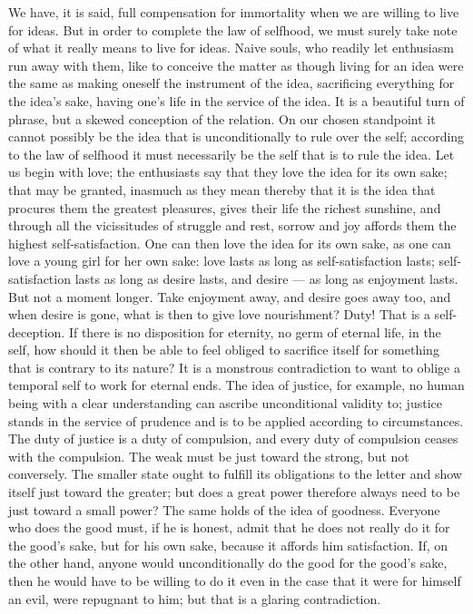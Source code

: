 \documentclass[12pt,a4paper,openany]{book}
\newcommand{\opage}[1]{\marginnote{\footnotesize\textit{[#1]}}}
\begin{document}
We have, it is said, full compensation for immortality
when we are willing to live for ideas. But in order to complete the law of selfhood,
we must surely take note of what it really means
to live for ideas. Naive souls, who readily let enthusiasm
run away with them, like to conceive the matter as though
living for an idea were the same as making oneself
the instrument of the idea, sacrificing everything for the idea's sake, having one's
life in the service of the idea. It is a beautiful turn of phrase, but
a skewed conception of the relation. On our
chosen standpoint it cannot possibly be the idea that is unconditionally to
rule over the self; according to the law of selfhood it must necessarily
be the self that is to rule the idea. Let us begin
with love; the enthusiasts say that they love
the idea for its own sake; that may be granted, inasmuch as
\setcounter{footnote}{0}%
\opage{202}they mean thereby that it is the idea that procures them the
greatest pleasures, gives their life the richest sunshine,
and through all the vicissitudes of struggle and rest, sorrow and
joy affords them the highest self-satisfaction. One
can then love the idea for its own sake, as one can
love a young girl for her own sake: love
lasts as long as self-satisfaction lasts; self-satisfaction
lasts as long as desire lasts, and desire ---
as long as enjoyment lasts. But not a moment
longer. Take enjoyment away, and desire goes away too,
and when desire is gone, what is then to give love
nourishment? Duty! That is a self-deception. If there is no
disposition for eternity, no germ of eternal life, in the self, how
should it then be able to feel obliged to sacrifice itself
for something that is contrary to its nature? It is a monstrous
contradiction to want to oblige a temporal self to work
for eternal ends. The idea of justice, for example, no
human being with a clear understanding can ascribe unconditional
validity to; justice stands in the service of prudence
and is to be applied according to circumstances. The duty of justice
is a duty of compulsion, and every duty of compulsion ceases
with the compulsion. The weak must be just
toward the strong, but not conversely. The smaller state
ought to fulfill its obligations to the letter and show
itself just toward the greater; but does a
great power therefore always need to be just toward a
small power? The same holds of the idea of goodness. Everyone
who does the good must, if he is honest, admit
that he does not really do it for the good's sake, but
for his own sake, because it affords him satisfaction.
If, on the other hand, anyone would unconditionally do the good for
\setcounter{footnote}{0}%
\opage{203}the good's sake, then he would have to be willing to do it even in the case that it were for himself an
evil, were repugnant to him; but that is a glaring
contradiction.
\end{document}
